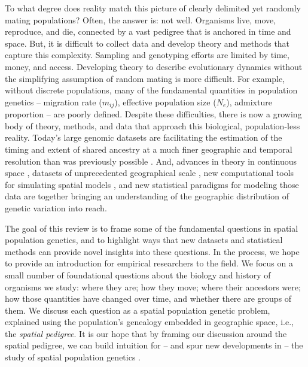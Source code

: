 \documentclass{ar-1col}
\renewcommand{\emph}[1]{{\textit{#1}}}
\begin{document}
To what degree does reality match this picture
of clearly delimited yet randomly mating populations?
Often, the answer is: not well.
Organisms live, move, reproduce, and die,
connected by a vast pedigree that is anchored in time and space.
But, it is difficult to collect data and develop theory and methods
that capture this complexity.
Sampling and genotyping efforts are limited by time, money, and access.
Developing theory to describe evolutionary dynamics
without the simplifying assumption of random mating
is more difficult.
For example, without discrete populations,
many of the fundamental quantities in population genetics -- 
migration rate ($m_{ij}$), 
effective population size ($N_e$),
admixture proportion
--
are poorly defined.
Despite these difficulties,
there is now a growing body of theory, methods, and data
that approach this biological, population-less reality.
Today's large genomic datasets
are facilitating the estimation of the timing and extent of shared ancestry 
at a much finer geographic and temporal resolution than was previously possible
\citep{Li_Durbin2011,Palamara_2012,Harris_Nielsen_2013,ralph2013geography}.
And, advances in theory in continuous space 
\citep{felsenstein1975pain,BartonWilson1995,barton-depaulis-etheridge, barton2010modelling, barton2010newmodel, Barton2013},
datasets of unprecedented geographical scale
\citep[e.g.,][]{POBI, Aguillon2017deconstructing, Shaffer195743},
new computational tools for simulating spatial models \citep{haller2018forward,haller2018treesequence},
and new statistical paradigms for modeling those data 
\citep{petkova2016visualizing, ringbauer2017inferring, ringbauer2018estimating, conStruct, alasadi2018estimating}
are together bringing an understanding of the geographic distribution of genetic variation into reach.

The goal of this review
is to frame some of the fundamental questions in spatial population genetics,
and to highlight ways that new datasets and statistical methods 
can provide novel insights into these questions.
In the process, 
we hope to provide an introduction for empirical researchers
to the field.
We focus on a small number of foundational questions 
about the biology and history of organisms we study:
where they are; how they move; where their ancestors were;
how those quantities have changed over time, 
and whether there are groups of them.
We discuss each question
as a spatial population genetic problem, 
explained using the 
population's genealogy embedded in geographic space,
i.e., the \emph{spatial pedigree}.
It is our hope that by framing our discussion around the spatial pedigree, 
we can build intuition for --
and spur new developments in --
the study of spatial population genetics .
\end{document}
